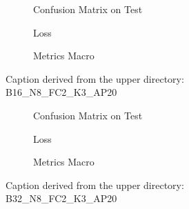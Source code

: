 \begin{figure}
    \centering
    \begin{subfigure}{0.3\linewidth}
        \centering
        
        \caption{Confusion Matrix on Test}
        \label{fig:confMatrixTest-2}
    \end{subfigure}
    \begin{subfigure}{0.3\linewidth}
        \centering
        
        \caption{Loss}
        \label{fig:loss-2}
    \end{subfigure}
    \begin{subfigure}{0.3\linewidth}
        \centering
        
        \caption{Metrics Macro}
        \label{fig:metricsMacro-2}
    \end{subfigure}

    \caption{Caption derived from the upper directory: B16\_N8\_FC2\_K3\_AP20}
    \label{fig:overallCaption-2}
\end{figure}


\begin{figure}
    \centering
    \begin{subfigure}{0.3\linewidth}
        \centering
        
        \caption{Confusion Matrix on Test}
        \label{fig:confMatrixTest-3}
    \end{subfigure}
    \begin{subfigure}{0.3\linewidth}
        \centering
        
        \caption{Loss}
        \label{fig:loss-3}
    \end{subfigure}
    \begin{subfigure}{0.3\linewidth}
        \centering
        
        \caption{Metrics Macro}
        \label{fig:metricsMacro-3}
    \end{subfigure}

    \caption{Caption derived from the upper directory: B32\_N8\_FC2\_K3\_AP20}
    \label{fig:overallCaption-3}
\end{figure}



